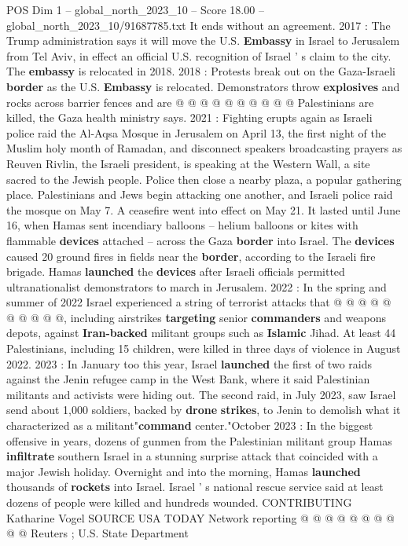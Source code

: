 \begin{textsample}{POS Dim 1 – global\_north\_2023\_10 – Score 18.00 – global\_north\_2023\_10/91687785.txt}
It ends without an agreement. 2017 : The Trump administration says it will move the U.S. \textbf{Embassy} in Israel to Jerusalem from Tel Aviv, in effect an official U.S. recognition of Israel ' s claim to the city.
The \textbf{embassy} is relocated in 2018. 2018 : Protests break out on the Gaza-Israeli \textbf{border} as the U.S. \textbf{Embassy} is relocated.
Demonstrators throw \textbf{explosives} and rocks across barrier fences and are @ @ @ @ @ @ @ @ @ @ Palestinians are killed, the Gaza health ministry says. 2021 : Fighting erupts again as Israeli police raid the Al-Aqsa Mosque in Jerusalem on April 13, the first night of the Muslim holy month of Ramadan, and disconnect speakers broadcasting prayers as Reuven Rivlin, the Israeli president, is speaking at the Western Wall, a site sacred to the Jewish people.
Police then close a nearby plaza, a popular gathering place.
Palestinians and Jews begin attacking one another, and Israeli police raid the mosque on May 7.
A ceasefire went into effect on May 21.
It lasted until June 16, when Hamas sent incendiary balloons -- helium balloons or kites with flammable \textbf{devices} attached -- across the Gaza \textbf{border} into Israel.
The \textbf{devices} caused 20 ground fires in fields near the \textbf{border}, according to the Israeli fire brigade.
Hamas \textbf{launched} the \textbf{devices} after Israeli officials permitted ultranationalist demonstrators to march in Jerusalem. 2022 : In the spring and summer of 2022 Israel experienced a string of terrorist attacks that @ @ @ @ @ @ @ @ @ @, including airstrikes \textbf{targeting} senior \textbf{commanders} and weapons depots, against \textbf{Iran-backed} militant groups such as \textbf{Islamic} Jihad.
At least 44 Palestinians, including 15 children, were killed in three days of violence in August 2022. 2023 : In January too this year, Israel \textbf{launched} the first of two raids against the Jenin refugee camp in the West Bank, where it said Palestinian militants and activists were hiding out.
The second raid, in July 2023, saw Israel send about 1,000 soldiers, backed by \textbf{drone} \textbf{strikes}, to Jenin to demolish what it characterized as a militant"\textbf{command} center."October 2023 : In the biggest offensive in years, dozens of gunmen from the Palestinian militant group Hamas \textbf{infiltrate} southern Israel in a stunning surprise attack that coincided with a major Jewish holiday.
Overnight and into the morning, Hamas \textbf{launched} thousands of \textbf{rockets} into Israel.
Israel ' s national rescue service said at least dozens of people were killed and hundreds wounded.
CONTRIBUTING Katharine Vogel SOURCE USA TODAY Network reporting @ @ @ @ @ @ @ @ @ @ Reuters ; U.S.
State Department

\end{textsample}
